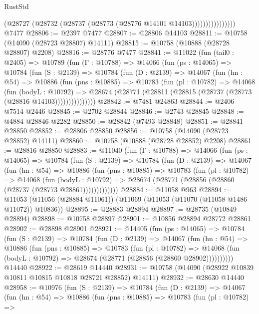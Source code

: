 \begin{lexlean}{RustStd}
\begin{coremodule}
                          (@28727 (@28732 (@28737 (@28773 (@28776 @14101 @14103))))))))))))))))
    @7477
@28806 := @2397 @7477
@28807 := @28806 @14103
@28811 := @10758 (@14090 (@28723 @28807) @14111)
@28815 := @10758 (@10888 (@28728 @28807) @2208)
@28816 := @28776 @7477
@28841 := @11022
    (fun (tail0 : @2405) =>
    @10789
      (fun (Γ : @10788) =>
      @14066
        (fun (ps : @14065) =>
        @10784
          (fun (S : @2139) =>
          @10784
            (fun (D : @2139) =>
            @14067
              (fun (hn : @54) =>
              @10886
                (fun (pns : @10885) =>
                @10783
                  (fun (pl : @10782) =>
                  @14068
                    (fun (bodyL : @10792) =>
                    @28674 (@28771 (@28811 (@28815 (@28737 (@28773 (@28816 @14103)))))))))))))))
@28842 := @7481 @24863
@28844 := @2406 @7514 @2446
@28845 := @2702 @28844
@28846 := @2743 @28845
@28848 := @4884 @28846 @2282
@28850 := @28842 (@7493 @28848)
@28851 := @28841 @28850
@28852 := @28806 @28850
@28856 := @10758 (@14090 (@28723 @28852) @14111)
@28860 := @10758 (@10888 (@28728 @28852) @2208)
@28861 := @28816 @28850
@28883 := @11040
    (fun (Γ : @10788) =>
    @14066
      (fun (ps : @14065) =>
      @10784
        (fun (S : @2139) =>
        @10784
          (fun (D : @2139) =>
          @14067
            (fun (hn : @54) =>
            @10886
              (fun (pns : @10885) =>
              @10783
                (fun (pl : @10782) =>
                @14068
                  (fun (bodyL : @10792) =>
                  @28674 (@28771 (@28856 (@28860 (@28737 (@28773 @28861)))))))))))))
@28884 := @11058 @963
@28894 := @11053 (@11056 (@28884 @11061)) (@11069 (@11053 (@11070 (@11058 @1486 @11072)) @10836))
@28895 := @28883 @28894
@28897 := @28735 (@10849 @28894)
@28898 := @10758 @28897
@28901 := @10856 @28894 @28772 @28861
@28902 := @28898 @28901
@28921 := @14405
    (fun (ps : @14065) =>
    @10784
      (fun (S : @2139) =>
      @10784
        (fun (D : @2139) =>
        @14067
          (fun (hn : @54) =>
          @10886
            (fun (pns : @10885) =>
            @10783
              (fun (pl : @10782) =>
              @14068 (fun (bodyL : @10792) => @28674 (@28771 (@28856 (@28860 @28902))))))))))
    @14440
@28922 := @28619 @14440
@28931 := @10758 (@14090 (@28922 @10839 @10811 @10815 @10818 @28721 @28852) @14111)
@28932 := @28630 @14440
@28958 := @10976
    (fun (S : @2139) =>
    @10784
      (fun (D : @2139) =>
      @14067
        (fun (hn : @54) =>
        @10886
          (fun (pns : @10885) =>
          @10783
            (fun (pl : @10782) =>

\end{coremodule}
\end{lexlean}
